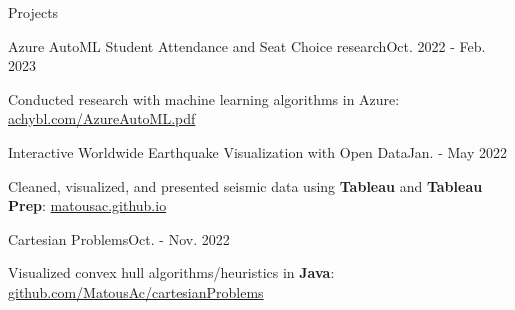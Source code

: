 \begin{rSection}{Projects}
	\begin{project}{Azure AutoML Student Attendance and Seat Choice research}{Oct. 2022 - Feb. 2023}
		\item Conducted research with machine learning algorithms in Azure: \href{https://achybl.com/AzureAutoML.pdf}{achybl.com/AzureAutoML.pdf}
	\end{project}
  \begin{project}{Interactive Worldwide Earthquake Visualization with Open Data}{Jan. - May 2022}
		\item Cleaned, visualized, and presented seismic data using {\bf Tableau} and {\bf Tableau Prep}: \href{https://matousac.github.io/}{matousac.github.io}
	\end{project}
	\begin{project}{Cartesian Problems}{Oct. - Nov. 2022}
		\item Visualized convex hull algorithms/heuristics in {\bf Java}: \href{https://github.com/MatousAc/cartesianProblems}{github.com/MatousAc/cartesianProblems}
	\end{project}
\end{rSection}